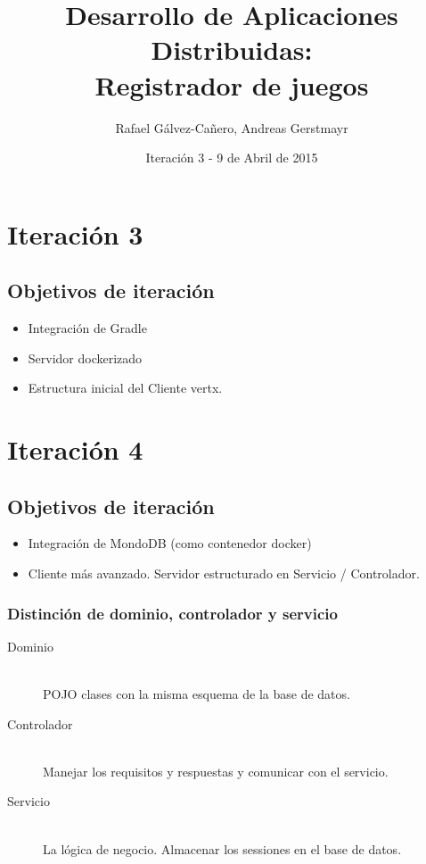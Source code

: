 \documentclass[12pt,a4paper]{report}
\title{Desarrollo de Aplicaciones Distribuidas: \\ Registrador de juegos}
\author{Rafael Gálvez-Cañero, Andreas Gerstmayr}
\date{Iteración 3 - 9 de Abril de 2015} %
\begin{document}
\maketitle
\tableofcontents
\listoffigures
\listoftables






\chapter{Iteración 3}
\section{Objetivos de iteración}
\begin{itemize}
  \item Integración de Gradle 
  \item Servidor dockerizado
  \item Estructura inicial del Cliente vertx.
\end{itemize}

\chapter{Iteración 4}
\section{Objetivos de iteración}
\begin{itemize}
  \item Integración de MondoDB (como contenedor docker) 
  \item Cliente más avanzado. Servidor estructurado en Servicio / Controlador.
\end{itemize}

\subsection{Distinción de dominio, controlador y servicio}
\begin{description}
  \item[Dominio] \hfill \\
  POJO clases con la misma esquema de la base de datos.
  \item[Controlador] \hfill \\
  Manejar los requisitos y respuestas y comunicar con el servicio.
  \item[Servicio] \hfill \\
  La lógica de negocio. Almacenar los sessiones en el base de datos.
\end{description}
\end{document}
